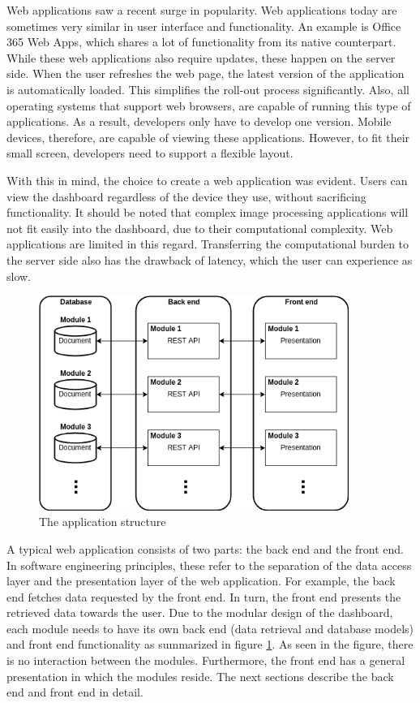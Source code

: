     Web applications saw a recent surge in popularity. Web applications today are sometimes very similar in user interface and functionality. An example is Office 365 Web Apps, which shares a lot of functionality from its native counterpart. While these web applications also require updates, these happen on the server side. When the user refreshes the web page, the latest version of the application is automatically loaded. This simplifies the roll-out process significantly. Also, all operating systems that support web browsers, are capable of running this type of applications. As a result, developers only have to develop one version. Mobile devices, therefore, are capable of viewing these applications. However, to fit their small screen, developers need to support a flexible layout.

    With this in mind, the choice to create a web application was evident. Users can view the dashboard regardless of the device they use, without sacrificing functionality. It should be noted that complex image processing applications will not fit easily into the dashboard, due to their computational complexity. Web applications are limited in this regard. Transferring the computational burden to the server side also has the drawback of latency, which the user can experience as slow.

    \begin{figure}[!t]
        \centering
        \includegraphics[width=0.9\textwidth]{chapters/4_implementation/structure}
        \caption{The application structure}\label{fig:structure}
    \end{figure}

    A typical web application consists of two parts: the back end and the front end. In software engineering principles, these refer to the separation of the data access layer and the presentation layer of the web application. For example, the back end fetches data requested by the front end. In turn, the front end presents the retrieved data towards the user. Due to the modular design of the dashboard, each module needs to have its own back end (data retrieval and database models) and front end functionality as summarized in figure \ref{fig:structure}.  As seen in the figure, there is no interaction between the modules. Furthermore, the front end has a general presentation in which the modules reside. The next sections describe the back end and front end in detail.

